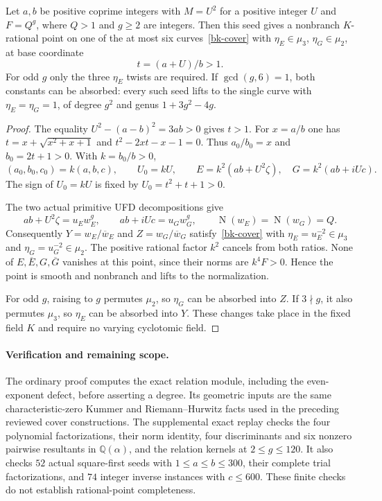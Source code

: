 \begin{theorem}
\label{bk-actual-lift}
Let $a,b$ be positive coprime integers with $M=U^2$ for a positive
integer $U$ and $F=Q^g$, where $Q>1$ and $g\ge2$ are integers.
Then this seed gives a nonbranch $K$-rational point on one of the at
most six curves~\eqref{bk-cover} with
$\eta_E\in\mu_3$, $\eta_G\in\mu_2$, at base coordinate
\begin{equation}\label{bk-actual-parameter}
 t=(a+U)/b>1.
\end{equation}
For odd $g$ only the three $\eta_E$ twists are required. If
$\gcd(g,6)=1$, both constants can be absorbed: every such seed lifts
to the single curve with $\eta_E=\eta_G=1$, of degree $g^2$ and
genus $1+3g^2-4g$.
\end{theorem}
\begin{proof}
The equality $U^2-(a-b)^2=3ab>0$ gives $t>1$.
For $x=a/b$ one has $t=x+\sqrt{x^2+x+1}$ and
$t^2-2xt-x-1=0$. Thus $a_0/b_0=x$ and $b_0=2t+1>0$.
With $k=b_0/b>0$,
\begin{equation}\label{bk-positive-scaling}
 (a_0,b_0,c_0)=k(a,b,c),\qquad U_0=kU,
 \qquad E=k^2(ab+U^2\zeta),\quad G=k^2(ab+iUc).
\end{equation}
The sign of $U_0=kU$ is fixed by $U_0=t^2+t+1>0$.

The two actual primitive UFD decompositions give
\[
 ab+U^2\zeta=u_Ew_E^g,\qquad ab+iUc=u_Gw_G^g,
 \qquad\operatorname N(w_E)=\operatorname N(w_G)=Q.
\]
Consequently $Y=w_E/\overline w_E$ and $Z=w_G/\overline w_G$
satisfy~\eqref{bk-cover} with $\eta_E=u_E^{-2}\in\mu_3$ and
$\eta_G=u_G^{-2}\in\mu_2$. The positive rational factor $k^2$
cancels from both ratios. None of $E,\overline E,G,\overline G$
vanishes at this point, since their norms are $k^4F>0$. Hence the
point is smooth and nonbranch and lifts to the normalization.

For odd $g$, raising to $g$ permutes $\mu_2$, so $\eta_G$ can be
absorbed into $Z$. If $3\nmid g$, it also permutes $\mu_3$, so
$\eta_E$ can be absorbed into $Y$. These changes take place in the
fixed field $K$ and require no varying cyclotomic field.
\end{proof}

\paragraph{Verification and remaining scope.}
The ordinary proof computes the exact relation module, including the
even-exponent defect, before asserting a degree. Its geometric inputs
are the same characteristic-zero Kummer and Riemann--Hurwitz facts
used in the preceding reviewed cover constructions. The supplemental
exact replay checks the four polynomial factorizations, their norm
identity, four discriminants and six nonzero pairwise resultants in
$\mathbb Q(\alpha)$, and the relation kernels at $2\le g\le120$.
It also checks $52$ actual square-first seeds with
$1\le a\le b\le300$, their complete trial factorizations, and $74$
integer inverse instances with $c\le600$. These finite checks do not
establish rational-point completeness.

